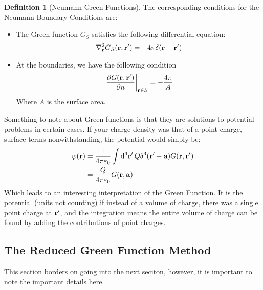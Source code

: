 \documentclass[12pt]{article}
\theoremstyle{plain}
\theoremstyle{definition}
\newtheorem{definition}{Definition}[section]
\renewcommand{\k}{\frac1{4\pi\varepsilon_0}}
\newcommand{\veps}{\varepsilon}
\let\temp\phi
\let\phi\varphi
\let\varphi\temp
\begin{document}
\begin{definition}[Neumann Green Functions]
  The corresponding conditions for the Neumann Boundary Conditions are:
  \begin{itemize}
  \item The Green function $G_S$ satisfies the following differential equation:
    \begin{align*}
      \laplacian_{\vb{r}}G_S(\vb{r,r}')=-4\pi\delta(\vb{r-r}')
    \end{align*}
  \item At the boundaries, we have the following condition
    \begin{align*}
      \eval{\pdv{G(\vb{r,r}')}{n}}_{\vb{r}\in S}=-\frac{4\pi}{A}
    \end{align*}
    Where $A$ is the surface area.
  \end{itemize}
\end{definition}

Something to note about Green functions is that they are solutions to potential problems in certain cases. If your charge density was that of a point charge, surface terms nonwithstanding, the potential would simply be:
\begin{align*}
  \phi(\vb{r})&=\k\int\dd[3]{\vb{r}'}Q\delta^3(\vb{r'-a})G(\vb{r,r}')\\
  &=\frac{Q}{4\pi\veps_0}G(\vb{r,a})
\end{align*}
Which leads to an interesting interpretation of the Green Function. It is the potential (units not counting) if instead of a volume of charge, there was a single point charge at $\vb{r}'$, and the integration means the entire volume of charge can be found by adding the contributions of point charges.

\subsection{The Reduced Green Function Method}
This section borders on going into the next seciton, however, it is important to note the important details here.
\end{document}
